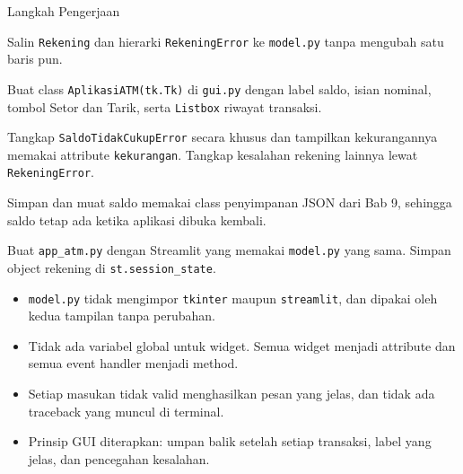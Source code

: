 \begin{langkah}{Langkah Pengerjaan}
  \item Salin \texttt{Rekening} dan hierarki \texttt{RekeningError} ke \texttt{model.py} tanpa mengubah satu baris pun.
  \item Buat class \texttt{AplikasiATM(tk.Tk)} di \texttt{gui.py} dengan label saldo, isian nominal, tombol Setor dan Tarik, serta \texttt{Listbox} riwayat transaksi.
  \item Tangkap \texttt{SaldoTidakCukupError} secara khusus dan tampilkan kekurangannya memakai attribute \texttt{kekurangan}. Tangkap kesalahan rekening lainnya lewat \texttt{RekeningError}.
  \item Simpan dan muat saldo memakai class penyimpanan JSON dari Bab 9, sehingga saldo tetap ada ketika aplikasi dibuka kembali.
  \item Buat \texttt{app\_atm.py} dengan Streamlit yang memakai \texttt{model.py} yang sama. Simpan object rekening di \texttt{st.session\_state}.
\end{langkah}

\begin{penting}
\begin{itemize}
  \item \texttt{model.py} tidak mengimpor \texttt{tkinter} maupun \texttt{streamlit}, dan dipakai oleh kedua tampilan tanpa perubahan.
  \item Tidak ada variabel global untuk widget. Semua widget menjadi attribute dan semua event handler menjadi method.
  \item Setiap masukan tidak valid menghasilkan pesan yang jelas, dan tidak ada traceback yang muncul di terminal.
  \item Prinsip GUI diterapkan: umpan balik setelah setiap transaksi, label yang jelas, dan pencegahan kesalahan.
\end{itemize}
\end{penting}